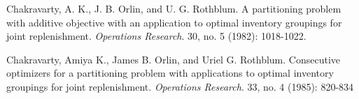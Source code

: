 \documentclass{article}
\theoremstyle{case}
\begin{document}
\begin{thebibliography}{1}

    Chakravarty, A. K., J. B. Orlin, and U. G. Rothblum. A partitioning problem with additive objective with an application to optimal inventory groupings for joint replenishment. {\em Operations Research}. 30, no. 5 (1982):
1018-1022.

     Chakravarty, Amiya K., James B. Orlin, and Uriel G. Rothblum. Consecutive optimizers for a partitioning problem with applications to optimal inventory groupings for joint replenishment. {\em Operations Research}. 33, no. 4 (1985):
820-834

\end{thebibliography}
\end{document}
